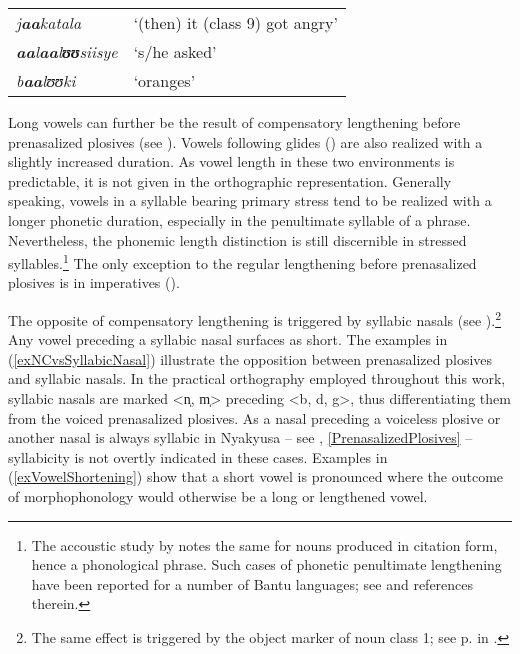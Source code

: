 \begin{exe}
	\ex
	\begin{tabular}[t]{@{}>{\itshape}ll}
		\textit{j\textbf{aa}katala} & \lq (then) it (class 9) got angry'\\
		\textit{\textbf{aa}l\textbf{aa}l\textbf{ʊʊ}siisye} & `s/he asked'\\
		\textit{b\textbf{aa}lʊʊki} & `oranges'
	\end{tabular}
\end{exe}
Long vowels can further be the result of compensatory lengthening before prenasalized plosives (see ). Vowels following glides () are also realized with a slightly increased duration. As vowel length in these two environments is predictable, it is not given in the orthographic representation.
Generally speaking, vowels in a syllable bearing primary stress tend to be realized with a longer phonetic duration, especially in the penultimate syllable of a phrase. Nevertheless, the phonemic length distinction is still discernible in stressed syllables.\footnote{The accoustic study by \citet{vanEssenOKaehler-MeyerE1969} notes the same for nouns produced in citation form, hence a phonological phrase. Such cases of phonetic penultimate lengthening have been reported for a number of Bantu languages; see \citet[313]{HymanL2013} and references therein.} The only exception to the regular lengthening before prenasalized plosives is in imperatives ().

The opposite of compensatory lengthening is triggered by syllabic nasals (see ).\footnote{The same effect is triggered by the object marker of noun class 1; see p.\nobreakspace\pageref{OMNCL1syllabic} in .} Any vowel preceding a syllabic nasal surfaces as short. The examples in (\ref{exNCvsSyllabicNasal}) illustrate the opposition between prenasalized plosives and syllabic nasals. In the practical orthography employed throughout this work, syllabic nasals are marked <n̩, m̩> preceding <b, d, g>, thus differentiating them from the voiced prenasalized plosives. As a nasal preceding a voiceless plosive or another nasal is always syllabic in Nyakyusa  -- see , \ref{PrenasalizedPlosives} -- syllabicity is not overtly indicated in these cases. Examples in (\ref{exVowelShortening}) show that a short vowel is pronounced where the outcome of morphophonology would otherwise be a long or lengthened vowel.

